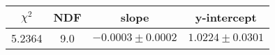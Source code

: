 \begin{tabular}{|c|c|c|c|}

\hline
$\chi^{2}$ & NDF & slope & y-intercept  \\
\hline
5.2364 & 9.0 & $-0.0003\pm0.0002$ & $1.0224\pm0.0301$ \\
\hline

\end{tabular}
